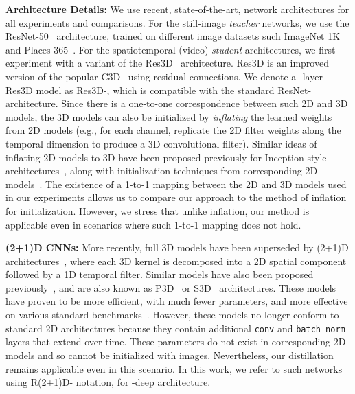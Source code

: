 \documentclass[10pt,twocolumn,letterpaper]{article}
\begin{document}
{\bf \noindent Architecture Details:}
We use recent, state-of-the-art, network architectures for all experiments and comparisons. For the still-image {\em teacher} networks, we use the  ResNet-50~\cite{He_16} architecture, trained on different image datasets such ImageNet 1K~\cite{ImageNet} and Places 365~\cite{zhou2017places}. For the spatiotemporal (video) {\em student} architectures, we first experiment with a variant of the Res3D~\cite{tran2017convnet} architecture. Res3D is an improved version of the popular
C3D~\cite{Tran_15} using residual connections. We denote a -layer Res3D model as Res3D-, which is compatible with the standard ResNet-~\cite{He_16} architecture. Since there is a one-to-one correspondence between such 2D and 3D models,
the 3D models can also be initialized by {\em inflating} the learned weights from 2D models (e.g., for each channel, replicate the 2D filter weights along the temporal dimension to produce a 3D convolutional filter). Similar ideas of inflating 2D models to 3D have  been proposed previously for Inception-style architectures~\cite{carreira2017quo}, along with initialization techniques from corresponding 2D models~\cite{carreira2017quo,Feichtenhofer_17,Feichtenhofer_16b}. The existence of a 1-to-1 mapping between the 2D and 3D models used in our experiments allows us to compare our approach to the method of inflation for initialization. However, we stress that unlike inflation, our method is applicable even in scenarios where such 1-to-1 mapping does not hold.

{\noindent \bf (2+1)D CNNs:} More recently, full 3D models have been superseded by (2+1)D architectures~\cite{tran2018closer},
where each 3D kernel is decomposed into a 2D spatial component followed by a 1D temporal filter. 
Similar models have also been proposed previously~\cite{sun2015human}, and are also known as P3D~\cite{qiu2017learning} or S3D~\cite{xie2017rethinking} architectures.
These models have proven to be more efficient, with much fewer parameters, and more effective on various standard benchmarks~\cite{xie2017rethinking,tran2018closer}.
However, these models no longer conform to standard 2D architectures because they contain additional \texttt{conv} and \texttt{batch\_norm} layers that extend over time. These parameters do not exist in
corresponding 2D models and so cannot be initialized with images. Nevertheless, our distillation remains applicable even in this scenario. In this work, we refer to such networks using R(2+1)D- notation, for -deep architecture.
\end{document}
